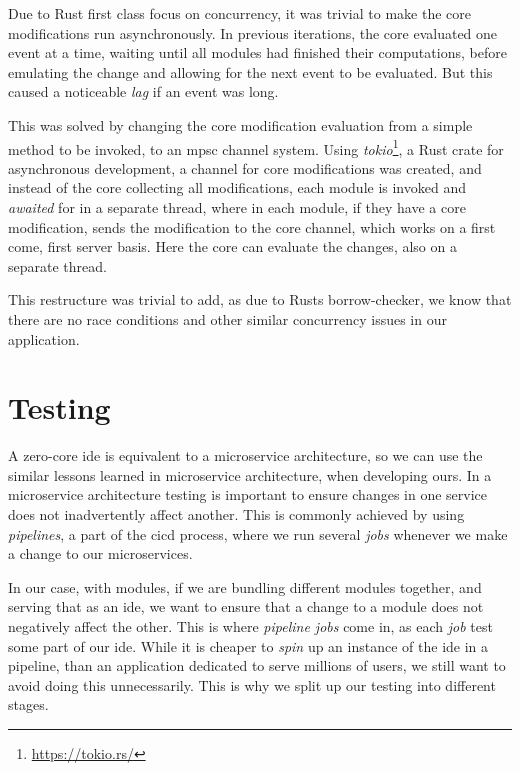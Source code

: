 Due to Rust first class focus on concurrency, it was trivial to make the core
modifications run asynchronously. In previous iterations, the core evaluated
one event at a time, waiting until all modules had finished their computations,
before emulating the change and allowing for the next event to be evaluated. But
this caused a noticeable \textit{lag} if an event was long.

This was solved by changing the core modification evaluation from a simple
method to be invoked, to an \gls*{mpsc} channel system. Using \textit{tokio}\footnote{\url{https://tokio.rs/}},
a Rust crate for asynchronous development, a channel for core modifications was
created, and instead of the core collecting all modifications, each module is
invoked and \textit{awaited} for in a separate thread, where in each module, if
they have a core modification, sends the modification to the core channel, which
works on a first come, first server basis. Here the core can evaluate the
changes, also on a separate thread.

This restructure was trivial to add, as due to Rusts borrow-checker, we know
that there are no race conditions and other similar concurrency issues in our
application.


\section{Testing} \label{sec:testing}

A zero-core \gls*{ide} is equivalent to a microservice architecture, so we can
use the similar lessons learned in microservice architecture, when developing
ours. In a microservice architecture testing is important to ensure changes in
one service does not inadvertently affect another. This is commonly achieved by
using \textit{pipelines}, a part of the \gls*{cicd} process, where we run
several \textit{jobs} whenever we make a change to our microservices.

In our case, with modules, if we are bundling different modules together, and
serving that as an \gls*{ide}, we want to ensure that a change to a module does
not negatively affect the other. This is where \textit{pipeline jobs} come in,
as each \textit{job} test some part of our \gls*{ide}. While it is cheaper to
\textit{spin} up an instance of the \gls*{ide} in a pipeline, than an
application dedicated to serve millions of users, we still want to avoid doing
this unnecessarily. This is why we split up our testing into different stages.


